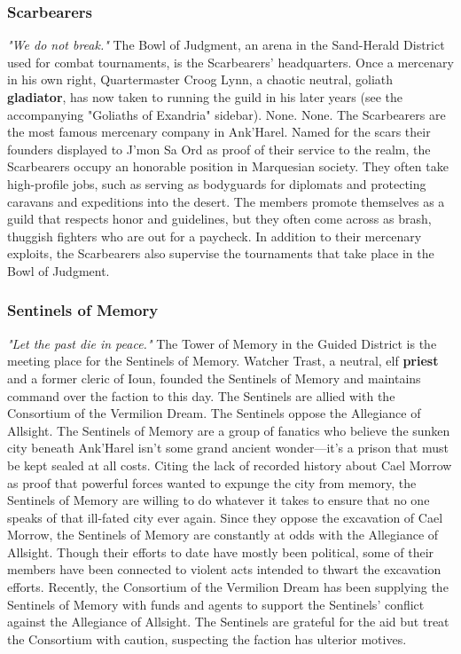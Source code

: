 \documentclass[10pt,a4,twoside,twocolumn,openany,nodeprecatedcode]{dndbook}
\begin{document}
\subsubsection{Scarbearers}
\textit{"We do not break."}
{{The Bowl of Judgment, an arena in the Sand-Herald District used for combat tournaments, is the Scarbearers' headquarters.}}
{{Once a mercenary in his own right, Quartermaster Croog Lynn, a chaotic neutral, goliath \textbf{gladiator}, has now taken to running the guild in his later years (see the accompanying "Goliaths of Exandria" sidebar).}}
{{None.}}
{{None.}}
The Scarbearers are the most famous mercenary company in Ank'Harel. Named for the scars their founders displayed to J'mon Sa Ord as proof of their service to the realm, the Scarbearers occupy an honorable position in Marquesian society. They often take high-profile jobs, such as serving as bodyguards for diplomats and protecting caravans and expeditions into the desert. The members promote themselves as a guild that respects honor and guidelines, but they often come across as brash, thuggish fighters who are out for a paycheck.
In addition to their mercenary exploits, the Scarbearers also supervise the tournaments that take place in the Bowl of Judgment.
\subsubsection{Sentinels of Memory}
\textit{"Let the past die in peace."}
{{The Tower of Memory in the Guided District is the meeting place for the Sentinels of Memory.}}
{{Watcher Trast, a neutral, elf \textbf{priest} and a former cleric of Ioun, founded the Sentinels of Memory and maintains command over the faction to this day.}}
{{The Sentinels are allied with the Consortium of the Vermilion Dream.}}
{{The Sentinels oppose the Allegiance of Allsight.}}
The Sentinels of Memory are a group of fanatics who believe the sunken city beneath Ank'Harel isn't some grand ancient wonder—it's a prison that must be kept sealed at all costs. Citing the lack of recorded history about Cael Morrow as proof that powerful forces wanted to expunge the city from memory, the Sentinels of Memory are willing to do whatever it takes to ensure that no one speaks of that ill-fated city ever again.
Since they oppose the excavation of Cael Morrow, the Sentinels of Memory are constantly at odds with the Allegiance of Allsight. Though their efforts to date have mostly been political, some of their members have been connected to violent acts intended to thwart the excavation efforts.
Recently, the Consortium of the Vermilion Dream has been supplying the Sentinels of Memory with funds and agents to support the Sentinels' conflict against the Allegiance of Allsight. The Sentinels are grateful for the aid but treat the Consortium with caution, suspecting the faction has ulterior motives.
\end{document}
